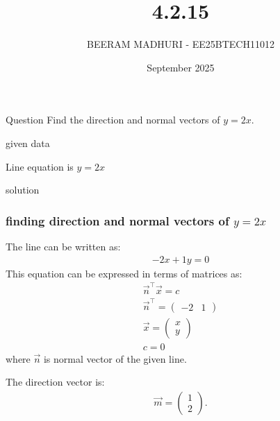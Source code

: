 \documentclass{beamer}
\title %
{4.2.15}
\date{September  2025}
\author %
{BEERAM MADHURI - EE25BTECH11012}
\begin{document}
\frame{\titlepage}
\begin{frame}{Question}
Find the direction and normal vectors of $y=2x$.

\end{frame}
 
\begin{frame}{given data}
 
Line equation is $y=2x$
   
\end{frame}

\begin{frame}{solution}
    \frametitle{finding direction and normal vectors of $y=2x$}
The line can be written as:
\begin{align}
-2x + 1y = 0
\end{align}
This equation can be expressed in terms of matrices as:
\begin{align}
\vec{n}^\top \vec{x} = c\\
\vec{n}^\top = \begin{pmatrix} -2 & 1 \end{pmatrix}\\
\vec{x} = \begin{pmatrix} x \\ y \end{pmatrix}\\
c = 0
\end{align}
where $\vec{n}$ is normal vector of the given line.

The direction vector is:
\begin{align}
\vec{m} = \begin{pmatrix} 1 \\ 2 \end{pmatrix}.
\end{align}
\end{frame}
\end{document}
